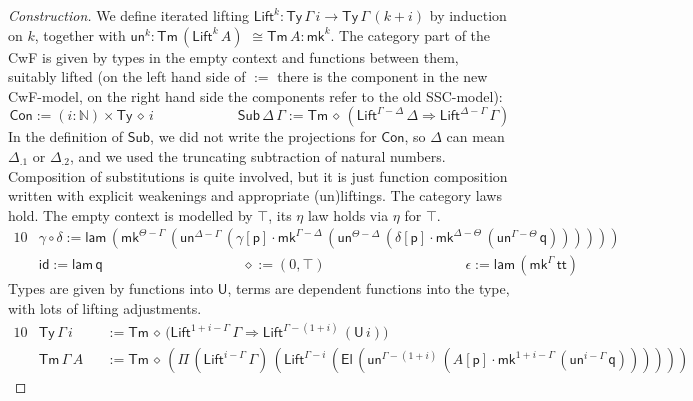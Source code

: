 \documentclass[submission,copyright,creativecommons]{eptcs}
\newcommand{\ra}{\rightarrow}
\newcommand{\Ra}{\Rightarrow}
\newcommand{\Ty}{\mathsf{Ty}}
\newcommand{\Tm}{\mathsf{Tm}}
\newcommand{\Con}{\mathsf{Con}}
\newcommand{\Sub}{\mathsf{Sub}}
\newcommand{\p}{\mathsf{p}}
\newcommand{\q}{\mathsf{q}}
\newcommand{\N}{\mathbb{N}}
\newcommand{\lam}{\mathsf{lam}}
\newcommand{\U}{\mathsf{U}}
\newcommand{\El}{\mathsf{El}}
\renewcommand{\tt}{\mathsf{tt}}
\newcommand{\Lift}{\mathsf{Lift}}
\newcommand{\mk}{\mathsf{mk}}
\newcommand{\un}{\mathsf{un}}
\newcommand{\id}{\mathsf{id}}
\begin{document}
\begin{proof}[Construction]
  We define iterated lifting $\Lift^k :
  \Ty\,\Gamma\,i\ra\Ty\,\Gamma\,(k+i)$ by induction on $k$, together
  with $\un^k : \Tm\,(\Lift^k\,A)$ $\cong\Tm\,A : \mk^k$. The category %
  part of the CwF is given by types in the empty context and functions
  between them, suitably lifted (on the left hand side of $:=$ there
  is the component in the new CwF-model, on the right hand side the
  components refer to the old SSC-model):
  \[
    \Con := (i:\N)\times\Ty\,\diamond\,i \hspace{6em}
    \Sub\,\Delta\,\Gamma := \Tm\,\diamond\,(\Lift^{\Gamma-\Delta}\,\Delta\Ra\Lift^{\Delta-\Gamma}\,\Gamma)
  \]
  In the definition of $\Sub$, we did not write the projections for
  $\Con$, so $\Delta$ can mean $\Delta_{.1}$ or $\Delta_{.2}$, and we used the truncating subtraction of
  natural numbers. Composition of substitutions is quite involved, but
  it is just function composition written with explicit weakenings and
  appropriate (un)liftings. The category laws hold. The empty context is
  modelled by $\top$, its $\eta$ law holds via $\eta$ for $\top$.
  \begin{alignat*}{10}
    & \gamma\circ\delta := \lam\,(\mk^{\Theta-\Gamma}\,(\un^{\Delta-\Gamma}\,(\gamma[\p]\cdot\mk^{\Gamma-\Delta}\,(\un^{\Theta-\Delta}\,(\delta[\p]\cdot\mk^{\Delta-\Theta}\,(\un^{\Gamma-\Theta}\,\q)))))) \\
    & \id := \lam\,\q \hspace{10em} \diamond := (0,\top) \hspace{10em} \epsilon := \lam\,(\mk^\Gamma\,\tt)
  \end{alignat*}
  Types are given by functions into $\U$, terms are dependent
  functions into the type, with lots of lifting adjustments.
  \begin{alignat*}{10}
    & \Ty\,\Gamma\,i && := \Tm\,\diamond\,\big(\Lift^{1+i-\Gamma}\,\Gamma\Ra\Lift^{\Gamma-(1+i)}\,(\U\,i)\big) \\
    & \Tm\,\Gamma\,A && := \Tm\,\diamond\,(\Pi\,(\Lift^{i-\Gamma}\,\Gamma)\,(\Lift^{\Gamma-i}\,(\El\,(\un^{\Gamma-(1+i)}\,(A[\p]\cdot\mk^{1+i-\Gamma}\,(\un^{i-\Gamma}\,\q))))))

\end{alignat*}
\end{proof}
\end{document}
